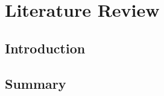 \def\baselinestretch{1}

\chapter{Literature Review}

\def\baselinestretch{1.66}





\section{Introduction}









\section{Summary}


